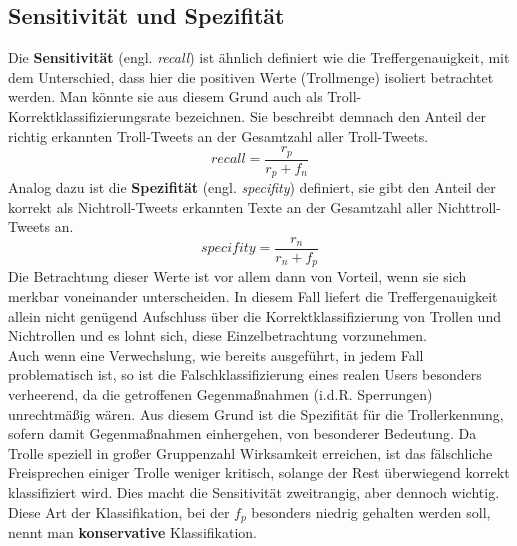 \subsection{Sensitivität und Spezifität}
Die \textbf{Sensitivität} (engl. \textit{recall}) ist ähnlich definiert wie die Treffergenauigkeit, mit dem Unterschied, dass hier die positiven Werte (Trollmenge) isoliert betrachtet werden. Man könnte sie aus diesem Grund auch als \glqq Troll-Korrektklassifizierungsrate\grqq{} bezeichnen. Sie beschreibt demnach den Anteil der richtig erkannten Troll-Tweets an der Gesamtzahl aller Troll-Tweets.
\begin{equation}
recall = \frac{r_p}{r_p + f_n}
\label{prec}
\end{equation}
Analog dazu ist die \textbf{Spezifität} (engl. \textit{specifity}) definiert, sie gibt den Anteil der korrekt als Nichtroll-Tweets erkannten Texte an der Gesamtzahl aller Nichttroll-Tweets an.
\begin{equation}
specifity = \frac{r_n}{r_n + f_p}
\end{equation}
Die Betrachtung dieser Werte ist vor allem dann von Vorteil, wenn sie sich merkbar voneinander unterscheiden. In diesem Fall liefert die Treffergenauigkeit allein nicht genügend Aufschluss über die Korrektklassifizierung von Trollen und Nichtrollen und es lohnt sich, diese Einzelbetrachtung vorzunehmen.\\Auch wenn eine Verwechslung, wie bereits ausgeführt, in jedem Fall problematisch ist, so ist die Falschklassifizierung eines realen Users besonders verheerend, da die getroffenen Gegenmaßnahmen (i.d.R. Sperrungen) unrechtmäßig wären. Aus diesem Grund ist die Spezifität für die Trollerkennung, sofern damit Gegenmaßnahmen einhergehen, von besonderer Bedeutung. Da Trolle speziell in großer Gruppenzahl Wirksamkeit erreichen, ist das fälschliche \glqq Freisprechen\grqq{} einiger Trolle weniger kritisch, solange der Rest überwiegend korrekt klassifiziert wird. Dies macht die Sensitivität zweitrangig, aber dennoch wichtig. Diese Art der Klassifikation, bei der $f_p$ besonders niedrig gehalten werden soll, nennt man \textbf{konservative} Klassifikation.
